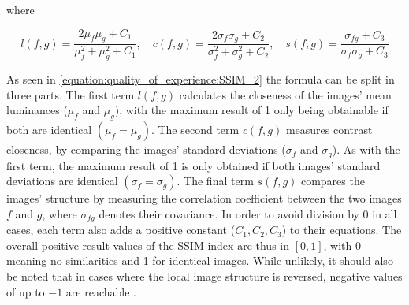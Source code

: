 where

\begin{equation}
l(f,g) = \dfrac{2\mu_{f}\mu_{g}+C_{1}}{\mu_{f}^{2} + \mu_{g}^{2}+C_{1}}, \quad
c(f,g) = \dfrac{2\sigma_{f}\sigma_{g}+C_{2}}{\sigma_{f}^{2} + \sigma_{g}^{2}+C_{2}}, \quad
s(f,g) = \dfrac{\sigma_{fg}+C_{3}}{\sigma_{f}\sigma_{g}+C_{3}}
\label{equation:quality_of_experience:SSIM_2}
\end{equation}

As seen in \ref{equation:quality_of_experience:SSIM_2} the formula can be split in three parts. The first term $ l(f,g) $ calculates the closeness of the images' mean luminances ($ \mu_{f} $ and $ \mu_{g} $), with the maximum result of 1 only being obtainable if both are identical $ (\mu_{f} = \mu_{g}) $. The second term $ c(f,g) $ measures contrast closeness, by comparing the images' standard deviations ($ \sigma_{f} $ and $ \sigma_{g} $). As  with the first term, the maximum result of 1 is only obtained if both images' standard deviations are identical $ (\sigma_{f} = \sigma_{g}) $. The final term $ s(f,g) $ compares the images' structure by measuring the correlation coefficient between the two images $ f $ and $ g $, where $ \sigma_{fg} $ denotes their covariance. In order to avoid division by 0 in all cases, each term also adds a positive constant ($ C_{1}, C_{2}, C_{3} $) to their equations. The overall positive result values of the SSIM index are thus in $ [0,1] $, with 0 meaning no similarities and 1 for identical images. While unlikely, it should also be noted that in cases where the local image structure is reversed, negative values of up to $ -1 $ are reachable \cite{BrZP08}.


